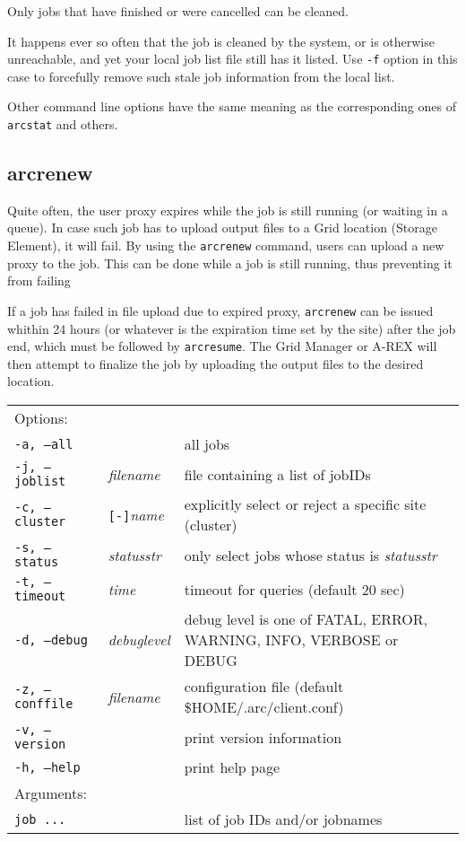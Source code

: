 Only jobs that have finished or were cancelled can be cleaned.

It happens ever so often that the job is cleaned by the system, or is otherwise unreachable, and yet your 
local job list file still has it listed. Use \verb#-f# option in this case to forcefully remove such stale job
information from the local list. 

Other command line options have the same meaning as the corresponding ones of \verb#arcstat# and others.


\subsection{arcrenew}
\label{sec:arcrenew}

Quite often, the user proxy expires while the job is still running (or
waiting in a queue). In case such job has to upload output files to a
Grid location (Storage Element), it will fail. By using the \texttt{arcrenew}
 command, users can upload
a new proxy to the job. This can be done while a job is still running,
thus preventing it from failing

If a job has failed in file upload due to expired proxy, \texttt{arcrenew}
can be issued whithin 24 hours (or whatever is
the expiration time set by the site) after the job
end, which must be followed by \texttt{arcresume}. The Grid
Manager or A-REX will then attempt to finalize
the job by uploading the output files to the desired location. 

\hspace*{0.5cm}
\begin{shaded}
\end{shaded}
\begin{longtable}{llp{8cm}}
   Options:&&\\
   \texttt{-a, --all}& & all jobs\\
   \texttt{-j, --joblist}& \textit{filename} & file containing a list of jobIDs\\
   \texttt{-c, --cluster}&\verb#[-]#\textit{name}&explicitly select or reject a specific site (cluster)\\
   \texttt{-s, --status}& \textit{statusstr} &only select jobs whose status is \textit{statusstr}\\
   \texttt{-t, --timeout}& \textit{time} & timeout for queries (default 20 sec)\\
   \texttt{-d, --debug}& \textit{debuglevel}&debug level is one of  FATAL, ERROR, WARNING, INFO, VERBOSE or DEBUG\\
   \texttt{-z, --conffile}&\textit{filename}& configuration file (default {\$}HOME/.arc/client.conf)\\
   \texttt{-v, --version}& & print version information\\
   \texttt{-h, --help}& & print help page\\
   Arguments:&&\\
   \texttt{job ...} && list of job IDs and/or jobnames\\
\end{longtable}

